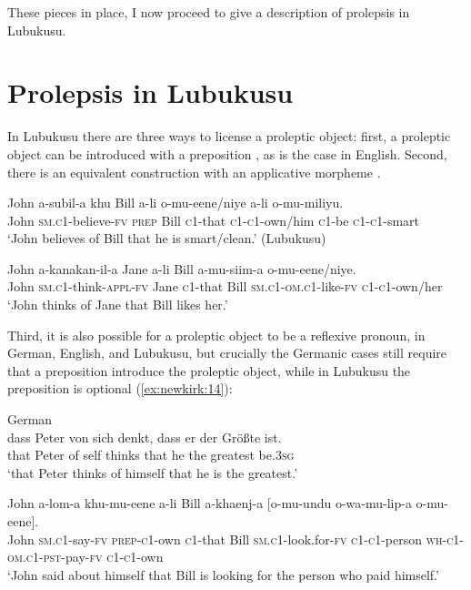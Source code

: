 \documentclass[output=paper,colorlinks,citecolor=brown]{langscibook}
\begin{document}
These pieces in place, I now proceed to give a description of prolepsis in Lubukusu.

\section{Prolepsis in Lubukusu}\label{sec:newkirk:2}

In Lubukusu there are three ways to license a proleptic object: first, a proleptic object can be introduced with a preposition , as is the case in English. Second, there is an equivalent construction with an applicative morpheme .

\ea%
    \label{ex:newkirk:10}
	\gll    John a-subil-a \alert{khu} \alert{Bill} a-li \alert{o-mu-eene}/\alert{niye} a-li o-mu-miliyu.\\
			John \textsc{sm.c1-}believe\textsc{-fv} \textsc{prep} Bill \textsc{c1-}that \textsc{c1-c1-}own/him \textsc{c1-}be \textsc{c1-c1-}smart\\
	\glt    `John believes of Bill that he is smart/clean.' 
	        \hfill (Lubukusu)
\z

\ea%
    \label{ex:newkirk:11}
    \gll    John a-kanakan-\alert{il}-a \alert{Jane} a-li Bill a-mu-siim-a \alert{o-mu-eene}/\alert{niye}.\\
			John \textsc{sm.c1-}think\textsc{-appl-fv} Jane \textsc{c1-}that Bill \textsc{sm.c1-om.c1-}like\textsc{-fv} \textsc{c1-c1-}own/her\\
	\glt `John thinks of Jane that Bill likes her.'
\z

Third, it is also possible for a proleptic object to be a reflexive pronoun, in German, English, and Lubukusu, but crucially the Germanic cases still require that a preposition introduce the proleptic object, while in Lubukusu the preposition is optional (\ref{ex:newkirk:14}):

\ea%
    \label{ex:newkirk:12}
    German \citep[ex. 12a]{Salzmann2017Chapter}\\
    \gll    dass Peter von \alert{sich} denkt, dass \alert{er} der Gr\"o\ss te ist.\\
	        that Peter of self thinks that he the greatest be.\textsc{3sg}\\
	\glt    `that Peter thinks of himself that he is the greatest.'
\z

\ea%
    \label{ex:newkirk:13}
    \gll    John a-lom-a \alert{khu-mu-eene} a-li Bill a-khaenj-a [o-mu-undu o-wa-mu-lip-a \alert{o-mu-eene}].\\
			John \textsc{sm.c1-}say\textsc{-fv} \textsc{prep-c1-}own \textsc{c1-}that Bill \textsc{sm.c1-}look.for\textsc{-fv} \textsc{c1-c1-}person \textsc{wh-c1-om.c1-pst-}pay\textsc{-fv} \textsc{c1-c1-}own\\
	\glt    `John said about himself that Bill is looking for the person who paid himself.'
\z
\end{document}
